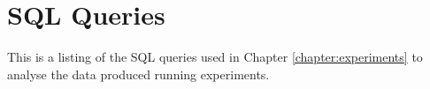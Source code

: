 \chapter{SQL Queries}
This is a listing of the SQL queries used in Chapter \ref{chapter:experiments} to analyse the data produced running experiments.



